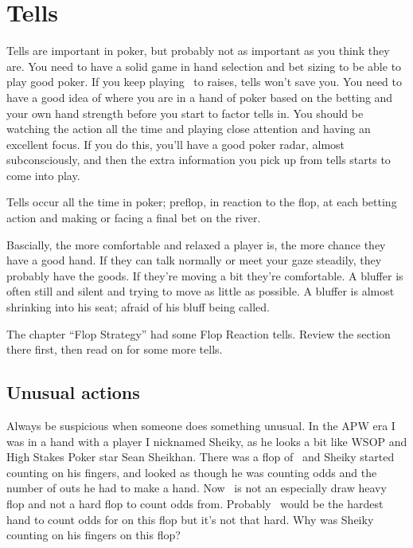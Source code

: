 \chapter{Tells}


Tells are important in poker, but probably not as important as you think
they are. You need to have a solid game in hand selection and bet sizing
to be able to play good poker. If you keep playing \Jh\sixc\ to
raises, tells won't save you. You need to have a good idea of where
you are in a hand of poker based on the betting and your own hand
strength before you start to factor tells in. You should be watching
the action all the time and playing close attention and having an
excellent focus. If you do this, you'll have a good poker radar,
almost subconsciously, and then the extra information you pick up from
tells starts to come into play.

Tells occur all the time in poker; preflop, in reaction to the flop,
at each betting action and making or facing a final bet on the river.

Bascially, the more comfortable and relaxed a player is, the more
chance they have a good hand. If they can talk normally or meet your
gaze steadily, they probably have the goods. If they're moving a bit
they're comfortable. A bluffer is often still and silent and trying to
move as little as possible. A bluffer is almost shrinking into his
seat; afraid of his bluff being called.

The chapter ``Flop Strategy'' had some Flop Reaction tells. 
Review the section there first, then read on for some more tells.

\section{Unusual actions}

Always be suspicious when someone does something unusual.
In the APW era I was in a hand with a player I nicknamed Sheiky, as
he looks a bit like WSOP and High Stakes Poker star Sean Sheikhan.
There was a flop of \Kc\nined\sevd\, and Sheiky started counting on his
fingers, and looked as though he was counting odds and the number
of outs he had to make a hand. Now \Kc\nined\sevd\ is not an especially
draw heavy flop and not a hard flop to count odds from. Probably
\Qd\tens\ would be the hardest hand to count odds for on this flop but
it's not that hard. Why was Sheiky counting on his fingers on this
flop?

